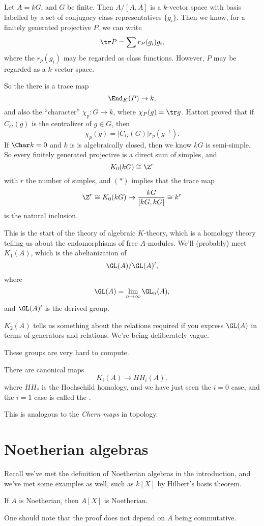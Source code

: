 \documentclass[a4paper]{article}
\begin{document}
\begin{eg}
  Let $A = kG$, and $G$ be finite. Then $A/[A, A]$ is a $k$-vector space with basis labelled by a set of conjugacy class representatives $\{g_i\}$. Then we know, for a finitely generated projective $P$, we can write
  \[
    \tr P = \sum r_P(g_i) g_i,
  \]
  where the $r_p(g_i)$ may be regarded as class functions. However, $P$ may be regarded as a $k$-vector space.

  So the there is a trace map
  \[
    \End_K(P) \to k,
  \]
  and also the ``character'' $\chi_p: G \to k$, where $\chi_P(g) = \tr g$. Hattori proved that if $C_G(g)$ is the centralizer of $g \in G$, then
  \[
    \chi_p(g) = |C_G(G)| r_p(g^{-1}).\tag{$*$}
  \]
  If $\Char k = 0$ and $k$ is is algebraically closed, then we know $kG$ is semi-simple. So every finitely generated projective is a direct sum of simples, and
  \[
    K_0(kG) \cong \Z^r
  \]
  with $r$ the number of simples, and $(*)$ implies that the trace map
  \[
    \Z^r \cong K_0(kG) \to \frac{kG}{[kG, kG]} \cong k^r
  \]
  is the natural inclusion.
\end{eg}
This is the start of the theory of algebraic $K$-theory, which is a homology theory telling us about the endomorphisms of free $A$-modules. We'll (probably) meet $K_1(A)$, which is the abelianization of
\[
  \GL(A)/\GL(A)',
\]
where
\[
  \GL(A) = \lim_{n \to \infty} \GL_n(A),
\]
and $\GL(A)'$ is the derived group.

$K_2(A)$ tells us something about the relations required if you express $\GL(A)$ in terms of generators and relations. We're being deliberately vague.

These groups are very hard to compute.

There are canonical maps
\[
  K_i(A) \to HH_i(A),
\]
where $HH_*$ is the Hochschild homology, and we have just seen the $i = 0$ case, and the $i = 1$ case is called the .

This is analogous to the \emph{Chern maps} in topology.

\section{Noetherian algebras}
Recall we've met the definition of Noetherian algebras in the introduction, and we've met some examples as well, such as $k[X]$ by Hilbert's basis theorem.
\begin{thm}
  If $A$ is Noetherian, then $A[X]$ is Noetherian.
\end{thm}
One should note that the proof does not depend on $A$ being commutative.
\end{document}
